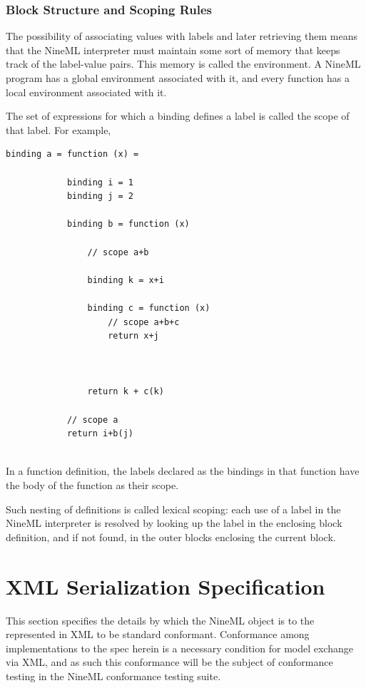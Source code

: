 \documentclass[a4paper]{article}
\begin{document}
\subsubsection{Block Structure and Scoping Rules}

The possibility of associating values with labels and later
retrieving them means that the NineML interpreter must maintain some
sort of memory that keeps track of the label-value pairs. This memory
is called the environment. A NineML program has a global environment
associated with it, and every function has a local
environment associated with it.

The set of expressions for which a binding defines a label is called
the scope of that label.  For example,

\begin{lstlisting}[style=display]
binding a = function (x) =

            binding i = 1
            binding j = 2

            binding b = function (x)

                // scope a+b

                binding k = x+i

                binding c = function (x)
                    // scope a+b+c
                    return x+j



                return k + c(k)

            // scope a
            return i+b(j)


\end{lstlisting}


In a function definition, the labels declared as the bindings in that
function have the body of the function as their scope.

Such nesting of definitions is called lexical scoping: each use of a
label in the NineML interpreter is resolved by looking up the label in
the enclosing block definition, and if not found, in the outer blocks
enclosing the current block.


\section{XML Serialization Specification}

This section specifies the details by which the NineML object is to
the represented in XML to be standard conformant.  Conformance among
implementations to the spec herein is a necessary condition for model
exchange via XML, and as such this conformance will be the subject of
conformance testing in the NineML conformance testing suite.
\end{document}
